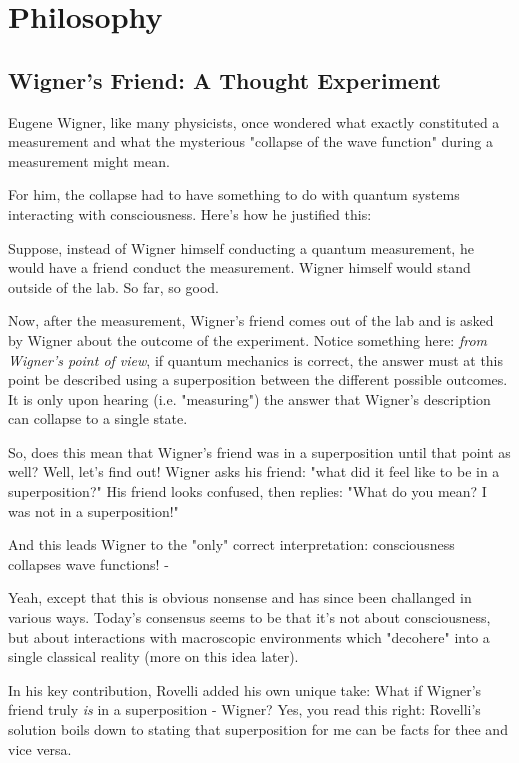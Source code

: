 \documentclass{article}
\begin{document}
\section{Philosophy}

\subsection{Wigner's Friend: A Thought Experiment}

Eugene Wigner, like many physicists, once wondered what exactly constituted a measurement and what the mysterious "collapse of the wave function" during a measurement might mean.

For him, the collapse had to have something to do with quantum systems interacting with consciousness. Here's how he justified this:

Suppose, instead of Wigner himself conducting a quantum measurement, he would have a friend conduct the measurement. Wigner himself would stand outside of the lab. So far, so good.

Now, after the measurement, Wigner's friend comes out of the lab and is asked by Wigner about the outcome of the experiment. Notice something here: \textit{from Wigner's point of view}, if quantum mechanics is correct, the answer must at this point be described using a superposition between the different possible outcomes. It is only upon hearing (i.e. "measuring") the answer that Wigner's description can collapse to a single state.

So, does this mean that Wigner's friend was in a superposition until that point as well? Well, let's find out! Wigner asks his friend: "what did it feel like to be in a superposition?" His friend looks confused, then replies: "What do you mean? I was not in a superposition!"

And this leads Wigner to the "only" correct interpretation: consciousness collapses wave functions! -

Yeah, except that this is obvious nonsense and has since been challanged in various ways. Today's consensus seems to be that it's not about consciousness, but about interactions with macroscopic environments which "decohere" into a single classical reality (more on this idea later).

In his key contribution, Rovelli added his own unique take: What if Wigner's friend truly \textit{is} in a superposition -  Wigner? Yes, you read this right: Rovelli's solution boils down to stating that superposition for me can be facts for thee and vice versa.
\end{document}
